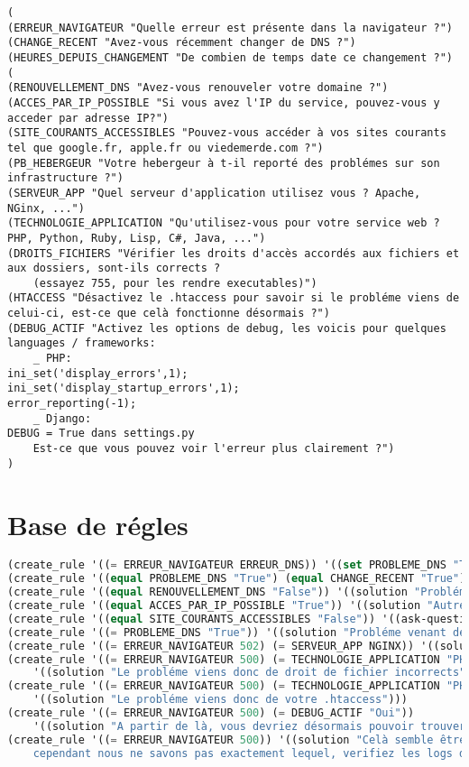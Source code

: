 \documentclass[a4paper, 10pt, leqno]{report}
\theoremstyle{plain}
\begin{document}
\begin{lstlisting}
(
(ERREUR_NAVIGATEUR "Quelle erreur est présente dans la navigateur ?")
(CHANGE_RECENT "Avez-vous récemment changer de DNS ?")
(HEURES_DEPUIS_CHANGEMENT "De combien de temps date ce changement ?")
(
(RENOUVELLEMENT_DNS "Avez-vous renouveler votre domaine ?")
(ACCES_PAR_IP_POSSIBLE "Si vous avez l'IP du service, pouvez-vous y acceder par adresse IP?")
(SITE_COURANTS_ACCESSIBLES "Pouvez-vous accéder à vos sites courants tel que google.fr, apple.fr ou viedemerde.com ?")
(PB_HEBERGEUR "Votre hebergeur à t-il reporté des problémes sur son infrastructure ?")
(SERVEUR_APP "Quel serveur d'application utilisez vous ? Apache, NGinx, ...")
(TECHNOLOGIE_APPLICATION "Qu'utilisez-vous pour votre service web ? PHP, Python, Ruby, Lisp, C#, Java, ...")
(DROITS_FICHIERS "Vérifier les droits d'accès accordés aux fichiers et aux dossiers, sont-ils corrects ?
	(essayez 755, pour les rendre executables)")
(HTACCESS "Désactivez le .htaccess pour savoir si le probléme viens de celui-ci, est-ce que celà fonctionne désormais ?")
(DEBUG_ACTIF "Activez les options de debug, les voicis pour quelques languages / frameworks:
	_ PHP:
ini_set('display_errors',1);
ini_set('display_startup_errors',1);
error_reporting(-1); 
	_ Django:
DEBUG = True dans settings.py
	Est-ce que vous pouvez voir l'erreur plus clairement ?")
)
\end{lstlisting}

\section{Base de régles}

\begin{lstlisting}[language=lisp]
(create_rule '((= ERREUR_NAVIGATEUR ERREUR_DNS)) '((set PROBLEME_DNS "True")))
(create_rule '((equal PROBLEME_DNS "True") (equal CHANGE_RECENT "True") (< HEURES_DEPUIS_CHANGEMENT 6)) '((solution "Probléme de propagation DNS")))
(create_rule '((equal RENOUVELLEMENT_DNS "False")) '((solution "Probléme de renouvellement DNS")))
(create_rule '((equal ACCES_PAR_IP_POSSIBLE "True")) '((solution "Autre probléme DNS")))
(create_rule '((equal SITE_COURANTS_ACCESSIBLES "False")) '((ask-question RENOUVELLEMENT_DNS "Avez-vous renouveler votre domaine ?")))
(create_rule '((= PROBLEME_DNS "True")) '((solution "Probléme venant de l'hébergeur de façon probable")))
(create_rule '((= ERREUR_NAVIGATEUR 502) (= SERVEUR_APP NGINX)) '((solution "Probléme de configuration NGINX, verifiez vos logs")))
(create_rule '((= ERREUR_NAVIGATEUR 500) (= TECHNOLOGIE_APPLICATION "PHP") (= DROITS_FICHIERS "Oui")) 
	'((solution "Le probléme viens donc de droit de fichier incorrects")))
(create_rule '((= ERREUR_NAVIGATEUR 500) (= TECHNOLOGIE_APPLICATION "PHP") (= HTACCESS "Oui")) 
	'((solution "Le probléme viens donc de votre .htaccess")))
(create_rule '((= ERREUR_NAVIGATEUR 500) (= DEBUG_ACTIF "Oui")) 
	'((solution "A partir de là, vous devriez désormais pouvoir trouver l'erreur qui à entrainer le probléme")))
(create_rule '((= ERREUR_NAVIGATEUR 500)) '((solution "Celà semble être un probléme avec votre application web,
	cependant nous ne savons pas exactement lequel, verifiez les logs de celle-ci pour en savoir plus")))
\end{lstlisting}
\end{document}
